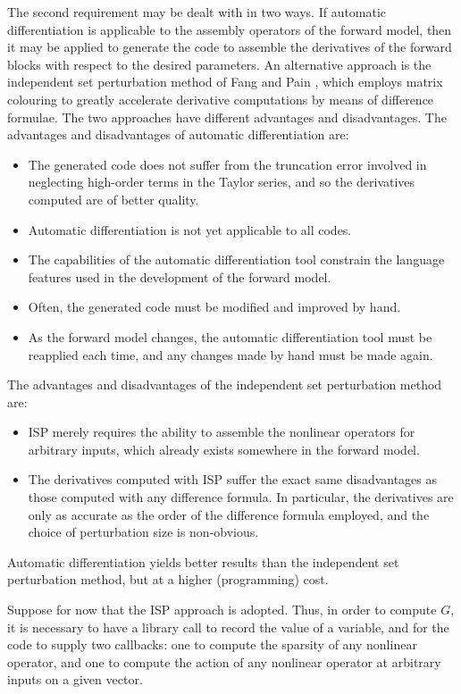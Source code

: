 \documentclass[10pt,authoryear]{elsarticle}
\begin{document}
The second requirement may be dealt with in two ways. If automatic differentiation is applicable to the
assembly operators of the forward model, then it may be applied to generate the code to assemble the derivatives
of the forward blocks with respect to the desired parameters. An alternative approach is the independent set
perturbation method of Fang and Pain \citep{fang2009a}, which employs matrix colouring to greatly accelerate derivative
computations by means of difference formulae. The two approaches have different advantages and disadvantages.
The advantages and disadvantages of automatic differentiation are:
\begin{itemize}
\item The generated code does not suffer from the truncation error involved in neglecting high-order terms in the Taylor series,
and so the derivatives computed are of better quality.
\item Automatic differentiation is not yet applicable to all codes.
\item The capabilities of the automatic differentiation tool constrain the language features used in the development of the forward model.
\item Often, the generated code must be modified and improved by hand.
\item As the forward model changes, the automatic differentiation tool must be reapplied each time, and any changes made by hand
must be made again.
\end{itemize}
The advantages and disadvantages of the independent set perturbation method are:
\begin{itemize}
\item ISP merely requires the ability to assemble the nonlinear operators for arbitrary inputs, which
already exists somewhere in the forward model.
\item The derivatives computed with ISP suffer the exact same disadvantages as those computed with any difference formula. In particular,
the derivatives are only as accurate as the order of the difference formula employed, and the choice of perturbation size
is non-obvious.
\end{itemize}
Automatic differentiation yields better results than the independent set perturbation method, but at a higher (programming) cost.

Suppose for now that the ISP approach is adopted. Thus, in order to compute $G$, it is necessary to have a library call to record
the value of a variable, and for the code to supply two callbacks: one to compute the sparsity of any nonlinear operator, and one to
compute the action of any nonlinear operator at arbitrary inputs on a given
vector.
\end{document}
